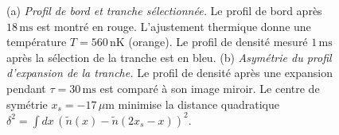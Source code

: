 \medskip


\begin{figure}[!htb]
\centering
{}
\caption{(a) {\it Profil de bord et tranche sélectionnée.} Le profil de bord après $18\,\mathrm{ms}$ est montré en rouge. L'ajustement thermique donne une température $T = 560\,\mathrm{nK}$ (orange). Le profil de densité mesuré $1\,\mathrm{ms}$ après la sélection de la tranche est en bleu. (b) {\it Asymétrie du profil d’expansion de la tranche.} Le profil de densité après une expansion pendant $\tau = 30\,\mathrm{ms}$ est comparé à son image miroir. Le centre de symétrie $x_s = -17\,\mu$m minimise la distance quadratique $\delta^2 = \int dx\, (\tilde{n}(x) - \tilde{n}(2x_s - x))^2$.}
\label{fig:simul_deformation}
\end{figure}



